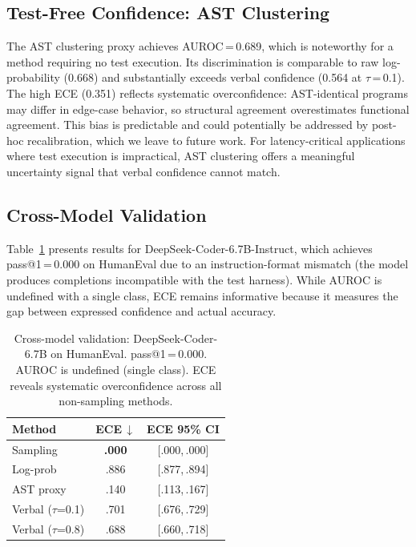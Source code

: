 \documentclass{article}
\begin{document}
\subsection{Test-Free Confidence: AST Clustering}
\label{sec:ast}

The AST clustering proxy achieves AUROC\,=\,0.689, which is noteworthy for a method requiring no test execution. Its discrimination is comparable to raw log-probability (0.668) and substantially exceeds verbal confidence (0.564 at $\tau$\,=\,0.1). The high ECE (0.351) reflects systematic overconfidence: AST-identical programs may differ in edge-case behavior, so structural agreement overestimates functional agreement. This bias is predictable and could potentially be addressed by post-hoc recalibration, which we leave to future work. For latency-critical applications where test execution is impractical, AST clustering offers a meaningful uncertainty signal that verbal confidence cannot match.

\subsection{Cross-Model Validation}
\label{sec:crossmodel}

Table~\ref{tab:deepseek} presents results for DeepSeek-Coder-6.7B-Instruct, which achieves pass@1\,=\,0.000 on HumanEval due to an instruction-format mismatch (the model produces completions incompatible with the test harness). While AUROC is undefined with a single class, ECE remains informative because it measures the gap between expressed confidence and actual accuracy.

\begin{table}[t]
\centering
\caption{Cross-model validation: DeepSeek-Coder-6.7B on HumanEval. pass@1\,=\,0.000. AUROC is undefined (single class). ECE reveals systematic overconfidence across all non-sampling methods.}
\label{tab:deepseek}
\small
\begin{tabular}{@{}lcc@{}}
\toprule
\textbf{Method} & \textbf{ECE\,$\downarrow$} & \textbf{ECE 95\% CI} \\
\midrule
Sampling & \textbf{.000} & {\scriptsize[.000,\,.000]} \\
Log-prob & .886 & {\scriptsize[.877,\,.894]} \\
AST proxy & .140 & {\scriptsize[.113,\,.167]} \\
Verbal ($\tau$=0.1) & .701 & {\scriptsize[.676,\,.729]} \\
Verbal ($\tau$=0.8) & .688 & {\scriptsize[.660,\,.718]} \\
\bottomrule
\end{tabular}
\vspace{-0.5em}
\end{table}
\end{document}
